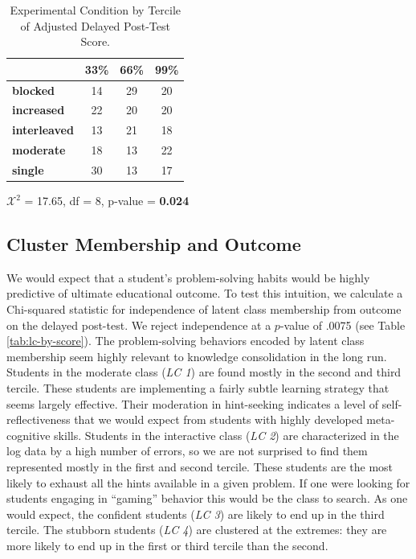 \documentclass{edm_template}
\begin{document}
\begin{table}[hbtp]

\centering
\begin{tabular}{|l || c | c | c |}
\hline
&33\%&66\%&99\%\\ \hline \hline
  \textbf{blocked}  &   14& 29& 20 \\ \hline
  \textbf{increased}&   22& 20& 20 \\ \hline
\textbf{interleaved}& 13& 21& 18 \\ \hline
  \textbf{moderate} &   18& 13& 22 \\ \hline
    \textbf{single} &      30& 13& 17 \\ \hline
 \end{tabular}
  \begin{center} $\mathcal{X}^2$ = 17.65, df = 8, p-value = {\bf 0.024} \end{center}
 \caption{Experimental Condition by Tercile of Adjusted Delayed Post-Test Score.}
\label{tab:exp-and-score}
\end{table}


\subsection{Cluster Membership and Outcome}
We would expect that a student's problem-solving habits would be highly predictive of ultimate educational outcome. To test this intuition, we calculate a Chi-squared statistic for independence of latent class membership from outcome on the delayed post-test. We reject independence at a $p$-value of .0075 (see Table \ref{tab:lc-by-score}). The problem-solving behaviors encoded by latent class membership seem highly relevant to knowledge consolidation in the long run. Students in the moderate class (\emph{LC 1}) are found mostly in the second and third tercile. These students are implementing a fairly subtle learning strategy that seems largely effective. Their moderation in hint-seeking indicates a level of self-reflectiveness that we would expect from students with highly developed meta-cognitive skills. Students in the interactive class (\emph{LC 2}) are characterized in the log data by a high number of errors, so we are not surprised to find them represented mostly in the first and second tercile. These students are the most likely to exhaust all the hints available in a given problem. If one were looking for students engaging in ``gaming'' behavior this would be the class to search. As one would expect, the confident  students (\emph{LC 3}) are likely to end up in the third tercile. The stubborn students (\emph{LC 4}) are clustered at the extremes: they are more likely to end up in the first or third tercile than the second. 
\end{document}
